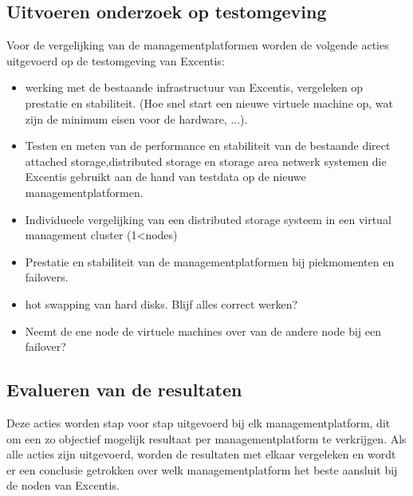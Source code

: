 \subsection{Uitvoeren onderzoek op testomgeving}
Voor de vergelijking van de managementplatformen worden de volgende acties uitgevoerd op de testomgeving van Excentis:
\begin{itemize}
\item werking met de bestaande infrastructuur van Excentis, vergeleken op prestatie en stabiliteit. (Hoe snel start een nieuwe virtuele machine op, wat zijn de minimum eisen voor de hardware, ...).
\item Testen en meten van de performance en stabiliteit van de bestaande direct attached storage,distributed storage en storage area netwerk systemen die Excentis gebruikt aan de hand van testdata op de nieuwe managementplatformen.
\item Individueele vergelijking van een distributed storage systeem in een virtual management cluster (1<nodes)
\item Prestatie en stabiliteit van de managementplatformen bij piekmomenten en failovers.
\item hot swapping van hard disks. Blijf alles correct werken? 
\item Neemt de ene node de virtuele machines over van de andere node bij een failover?
\end{itemize}

\subsection{Evalueren van de resultaten}
Deze acties worden stap voor stap uitgevoerd bij elk managementplatform, dit om een zo objectief mogelijk resultaat per managementplatform te verkrijgen.
Als alle acties zijn uitgevoerd, worden de resultaten met elkaar vergeleken en wordt er een conclusie getrokken over welk managementplatform het beste aansluit bij de noden van Excentis.